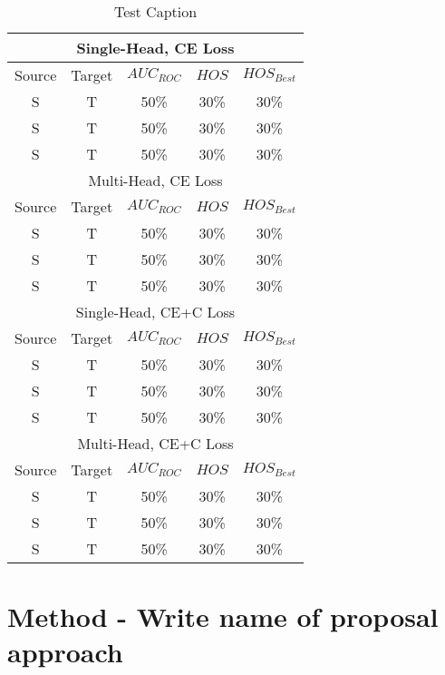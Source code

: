 \documentclass[10pt,twocolumn,letterpaper]{article}
\begin{document}
\begin{center}
  \begin{table}
    \begin{tabular}[h]{||c|c|c||c|c||}
      \hline
      \multicolumn{5}{||c||}{Single-Head, CE Loss} \\
      \hline
      Source & Target & $AUC_{ROC}$ & $HOS$ & $HOS_{Best}$ \\
      S & T & 50\% & 30\% & 30\% \\
      S & T & 50\% & 30\% & 30\% \\
      S & T & 50\% & 30\% & 30\% \\
      \hline
      \hline
      \multicolumn{5}{||c||}{Multi-Head, CE Loss} \\
      \hline
      Source & Target & $AUC_{ROC}$ & $HOS$ & $HOS_{Best}$ \\
      S & T & 50\% & 30\% & 30\% \\
      S & T & 50\% & 30\% & 30\% \\
      S & T & 50\% & 30\% & 30\% \\
      \hline
      \hline
      \multicolumn{5}{||c||}{Single-Head, CE+C Loss} \\
      \hline
      Source & Target & $AUC_{ROC}$ & $HOS$ & $HOS_{Best}$ \\
      S & T & 50\% & 30\% & 30\% \\
      S & T & 50\% & 30\% & 30\% \\
      S & T & 50\% & 30\% & 30\% \\
      \hline
      \hline
      \multicolumn{5}{||c||}{Multi-Head, CE+C Loss} \\
      \hline
      Source & Target & $AUC_{ROC}$ & $HOS$ & $HOS_{Best}$ \\
      S & T & 50\% & 30\% & 30\% \\
      S & T & 50\% & 30\% & 30\% \\
      S & T & 50\% & 30\% & 30\% \\
      \hline 

    \end{tabular}
    \caption{\label{tab:resoffoff}Test Caption}
  \end{table}
\end{center}


\section{Method - Write name of proposal approach}
\label{sec:method}
\end{document}

